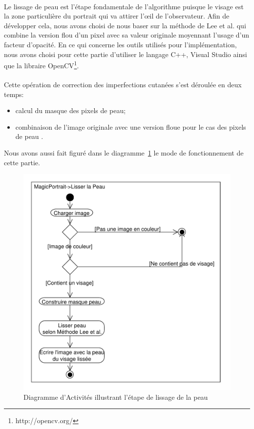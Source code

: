 \documentclass[11pt, french,screen]{report-rd-info}
\begin{document}
\paragraph*{}
Le lissage de peau est l'étape fondamentale de l'algorithme puisque le visage est la zone particulière du portrait qui va attirer l'œil de l'observateur. Afin de développer cela, nous avons choisi de nous baser sur la méthode de Lee et al. \cite{Lee} qui combine la version flou d'un pixel avec sa valeur originale moyennant l'usage d'un facteur d'opacité. En ce qui concerne les outils utilisés pour l’implémentation, nous avons choisi pour cette partie d'utiliser le langage C++, Visual Studio ainsi que la libraire OpenCV\footnote{http://opencv.org/}.
\paragraph*{}
Cette opération de correction des imperfections cutanées s'est déroulée en deux temps:
\begin{itemize}
\item calcul du masque des pixels de peau;
\item combinaison de l'image originale avec une version floue pour le cas des pixels de peau \cite{Lee}.
\end{itemize}
Nous avons aussi fait figuré dans le diagramme~\ref{diag:diagramme10} le mode de fonctionnement de cette partie.
\begin{figure}
\centering
\includegraphics[scale=0.5]{Diagrammes/DiagrammeActivites_10_LissagePeau}
\caption{Diagramme d'Activités illustrant l'étape de lissage de la peau}
\label{diag:diagramme10}
\end{figure}
\end{document}
